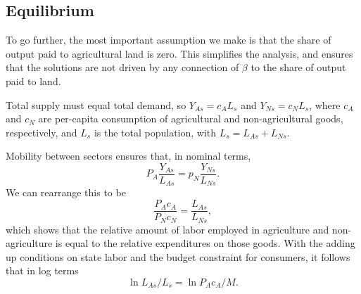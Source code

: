 \documentclass[11pt]{article}
\begin{document}
\subsection{Equilibrium}
To go further, the most important assumption we make is that the share of output paid to agricultural land is zero. This simplifies the analysis, and ensures that the solutions are not driven by any connection of $\beta$ to the share of output paid to land. 

Total supply must equal total demand, so $Y_{As} = c_A L_s$ and $Y_{Ns} = c_N L_s$, where $c_A$ and $c_N$ are per-capita consumption of agricultural and non-agricultural goods, respectively, and $L_s$ is the total population, with $L_s = L_{As} + L_{Ns}$.

Mobility between sectors ensures that, in nominal terms,
\begin{equation}
    P_A \frac{Y_{As}}{L_{As}} = p_N \frac{Y_{Ns}}{L_{Ns}}. \label{EQ_mobility}
\end{equation}
We can rearrange this to be
\begin{equation}
    \frac{P_A c_A}{P_N c_N} = \frac{L_{As}}{L_{Ns}}, \label{EQ_expend}
\end{equation}
which shows that the relative amount of labor employed in agriculture and non-agriculture is equal to the relative expenditures on those goods. With the adding up conditions on state labor and the budget constraint for consumers, it follows that in log terms
\begin{equation}
    \ln L_{As}/L_s = \ln P_A c_A/M. \label{EQ_pacaM}
\end{equation}
\end{document}

